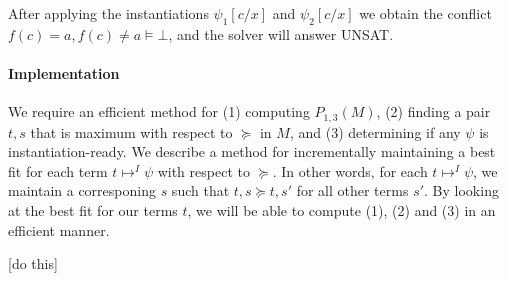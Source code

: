 \documentclass{llncs}
\begin{document}
After applying the instantiations $\psi_1[c/x]$ and $\psi_2[c/x]$ we obtain the conflict $f( c ) = a, f( c ) \neq a \models \bot$, and the solver will answer UNSAT. \\




\paragraph{Implementation}

We require an efficient method for (1) computing $P_{1,3}(M)$, (2) finding a pair $t, s$ that is maximum with respect to $\succeq$ in $M$, and (3) determining if any $\psi$ is instantiation-ready.
We describe a method for incrementally maintaining a best fit for each term $t \mapsto^I \psi$ with respect to $\succeq$.
In other words, for each $t \mapsto^I \psi$, we maintain a corresponing $s$ such that $t,s \succeq t,s'$ for all other terms $s'$.
By looking at the best fit for our terms $t$, we will be able to compute (1), (2) and (3) in an efficient manner.

[do this] \\
\end{document}
